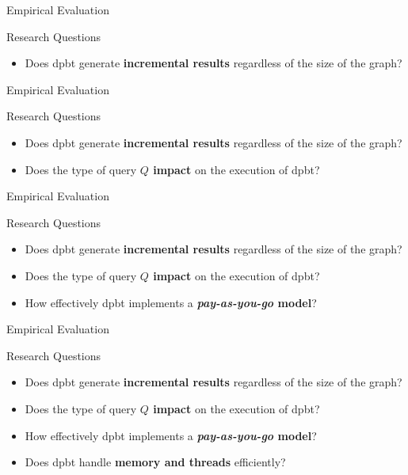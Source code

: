 \begin{frame}[fragile]{Empirical Evaluation}
  \begin{block}{Research Questions}
    \begin{itemize}
        \item Does \acrshort{dpbt} generate \textbf{incremental results} regardless of the size of the graph?
    \end{itemize}        
  \end{block}
\end{frame}

\begin{frame}[fragile]{Empirical Evaluation}
  \begin{block}{Research Questions}
    \begin{itemize}
        \item Does \acrshort{dpbt} generate \textbf{incremental results} regardless of the size of the graph?
        \item Does the type of query \textbf{$Q$ impact} on the execution of \acrshort{dpbt}?
    \end{itemize}        
  \end{block}
\end{frame}

\begin{frame}[fragile]{Empirical Evaluation}
  \begin{block}{Research Questions}
    \begin{itemize}
        \item Does \acrshort{dpbt} generate \textbf{incremental results} regardless of the size of the graph?
        \item Does the type of query \textbf{$Q$ impact} on the execution of \acrshort{dpbt}?
        \item How effectively \acrshort{dpbt} implements a \textbf{\emph{pay-as-you-go} model}?
    \end{itemize}        
  \end{block}
\end{frame}

\begin{frame}[fragile]{Empirical Evaluation}
  \begin{block}{Research Questions}
    \begin{itemize}
        \item Does \acrshort{dpbt} generate \textbf{incremental results} regardless of the size of the graph?
        \item Does the type of query \textbf{$Q$ impact} on the execution of \acrshort{dpbt}?
        \item How effectively \acrshort{dpbt} implements a \textbf{\emph{pay-as-you-go} model}?
        \item Does \acrshort{dpbt} handle \textbf{memory and threads} efficiently?
    \end{itemize}        
  \end{block}
\end{frame}

